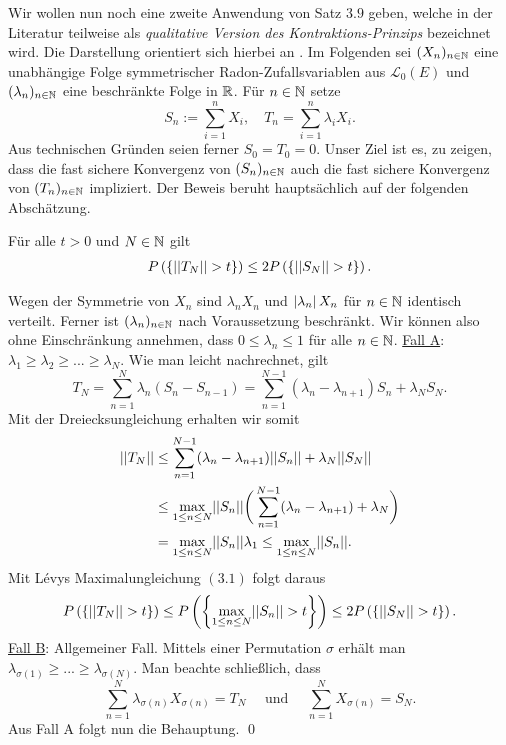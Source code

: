 Wir wollen nun noch eine zweite Anwendung von Satz $3.9$ geben, welche in der Literatur teilweise als \textit{qualitative Version des Kontraktions-Prinzips} bezeichnet wird. Die Darstellung orientiert sich hierbei an \cite{li-queffelec}. 
Im Folgenden sei $(X_n)_{n \in \mathbb{N}}$ eine unabhängige Folge symmetrischer Radon-Zufallsvariablen aus $\mathcal{L}_0(E)$ und $(\lambda_n)_{n \in \mathbb{N}}$ eine beschränkte Folge in $\mathbb{R}$. 
Für $n \in \mathbb{N}$ setze
$$
    S_n := \sum_{i=1}^nX_i, \quad T_n = \sum_{i=1}^n\lambda_iX_i. 
$$
Aus technischen Gründen seien ferner $S_0 = T_0 = 0$. 
Unser Ziel ist es, zu zeigen, dass die fast sichere Konvergenz von $(S_n)_{n \in \mathbb{N}}$ auch die fast sichere Konvergenz von $(T_n)_{n \in \mathbb{N}}$ impliziert. 
Der Beweis beruht hauptsächlich auf der folgenden Abschätzung. 
\begin{lemma}
    Für alle $t > 0$ und $N \in \mathbb{N}$ gilt
    \begin{align}
        P\left(\left\{ \lvert\lvert T_N \rvert\rvert > t \right\}\right) \leq 2 P\left(\left\{ \lvert\lvert S_N \rvert\rvert > t \right\}\right). 
    \end{align}
\end{lemma}

\begin{proof*}
    Wegen der Symmetrie von $X_n$ sind $\lambda_n X_n$ und $\left| \lambda_n \right|X_n$ für $n \in \mathbb{N}$ identisch verteilt. Ferner ist $(\lambda_n)_{n \in \mathbb{N}}$ nach Voraussetzung beschränkt. 
    Wir können also ohne Einschränkung annehmen, dass $0 \leq \lambda_n \leq 1$ für alle $n \in \mathbb{N}$. 
    \newline 
    \underline{Fall A}: $\lambda_1 \geq \lambda_2 \geq... \geq \lambda_N$. 
    \newline 
    Wie man leicht nachrechnet, gilt  
    $$
        T_N = \sum_{n=1}^N \lambda_n(S_n - S_{n-1}) = \sum_{n=1}^{N-1}(\lambda_n - \lambda_{n+1})S_n + \lambda_N S_N. 
    $$
    Mit der Dreiecksungleichung erhalten wir somit
    \begin{align*}
        \lvert\lvert T_N \rvert\rvert &\leq \sum_{n=1}^{N-1}(\lambda_n - \lambda_{n+1})\lvert\lvert S_n \rvert\rvert + \lambda_N \lvert\lvert S_N \rvert\rvert \\\
                   &\leq \max_{1 \leq n \leq N}\lvert\lvert S_n \rvert\rvert \bigg(\sum_{n=1}^{N-1}(\lambda_n - \lambda_{n+1}) + \lambda_N\bigg) \\\
                   &= \max_{1\leq n \leq N}\lvert\lvert S_n \rvert\rvert \lambda_1 \leq \max_{1\leq n \leq N}\lvert\lvert S_n \rvert\rvert.
    \end{align*}
    Mit Lévys Maximalungleichung $(3.1)$ folgt daraus
    $$
        P\left(\left\{ \lvert\lvert T_N \rvert\rvert > t \right\}\right) \leq P\left(\left\{ \max_{1 \leq n \leq N}\lvert\lvert S_n \rvert\rvert > t \right\}\right) \leq 2 P\left(\left\{ \lvert\lvert S_N \rvert\rvert > t \right\}\right).
    $$
    \underline{Fall B}: Allgemeiner Fall. 
    \newline 
    Mittels einer Permutation $\sigma$ erhält man $\lambda_{\sigma(1)} \geq ... \geq \lambda_{\sigma(N)}$. Man beachte schließlich, dass 
    $$
        \sum_{n=1}^N\lambda_{\sigma(n)}X_{\sigma(n)} = T_N \quad \text{ und } \quad \sum_{n=1}^N X_{\sigma(n)} = S_N.
    $$ 
    Aus Fall A folgt nun die Behauptung. \qed
\end{proof*}


